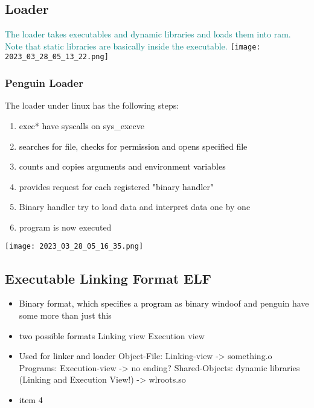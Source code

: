 \documentclass[main.tex,fontsize=8pt,paper=a4,paper=portrait,DIV=calc,]{scrartcl}
\begin{document}
\subsection{Loader}
\textcolor{teal}{The loader takes executables and dynamic libraries and loads them into ram.\newline
Note that static libraries are basically inside the executable.}\newline
\texttt{[image: 2023\_03\_28\_05\_13\_22.png]}

\subsubsection{Penguin Loader}
The loader under linux has the following steps: 
\begin{enumerate}
\item \textcolor{black}{exec* have syscalls on sys\_execve}
\item \textcolor{black}{searches for file, checks for permission and opens specified file}
\item \textcolor{black}{counts and copies arguments and environment variables}
\item \textcolor{black}{provides request for each registered "binary handler"}
\item Binary handler try to load data and interpret data one by one
\item program is now executed
\end{enumerate} 
\texttt{[image: 2023\_03\_28\_05\_16\_35.png]}

\subsection{Executable Linking Format ELF}
\begin{itemize}
\item \textcolor{black}{Binary format, which specifies a program as binary}\newline
  windoof and penguin have some more than just this
\item \textcolor{black}{two possible formats}\newline
  Linking view\newline
  Execution view
\item \textcolor{black}{Used for linker and loader}\newline
  Object-File: Linking-view -> something.o
  Programs: Execution-view -> no ending?
  Shared-Objects: dynamic libraries (Linking and Execution View!) -> wlroots.so
\item \textcolor{black}{item 4}
\end{itemize} 
\end{document}
